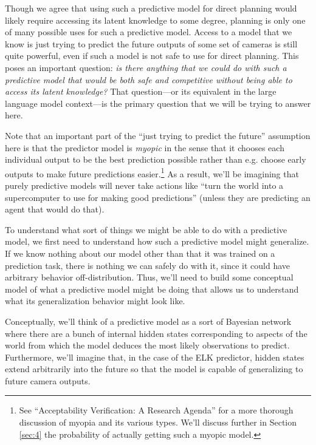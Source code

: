\documentclass[
  onecolumn,
  nonatbib,
]{miri-tech-article}
\begin{document}
Though we agree that using such a predictive model for direct planning would likely require accessing its latent knowledge to some degree, planning is only one of many possible uses for such a predictive model. Access to a model that we know is just trying to predict the future outputs of some set of cameras is still quite powerful, even if such a model is not safe to use for direct planning. This poses an important question: \textit{is there anything that we could do with such a predictive model that would be both safe and competitive without being able to access its latent knowledge?} That question---or its equivalent in the large language model context---is the primary question that we will be trying to answer here.

Note that an important part of the ``just trying to predict the future'' assumption here is that the predictor model is \textit{myopic} in the sense that it chooses each individual output to be the best prediction possible rather than e.g. choose early outputs to make future predictions easier.\footnote{See ``Acceptability Verification: A Research Agenda''\cite{acceptability_verification} for a more thorough discussion of myopia and its various types. We'll discuss further in Section \ref{sec:4} the probability of actually getting such a myopic model.} As a result, we'll be imagining that purely predictive models will never take actions like ``turn the world into a supercomputer to use for making good predictions'' (unless they are predicting an agent that would do that).

To understand what sort of things we might be able to do with a predictive model, we first need to understand how such a predictive model might generalize. If we know nothing about our model other than that it was trained on a prediction task, there is nothing we can safely do with it, since it could have arbitrary behavior off-distribution. Thus, we'll need to build some conceptual model of what a predictive model might be doing that allows us to understand what its generalization behavior might look like.

Conceptually, we'll think of a predictive model as a sort of Bayesian network where there are a bunch of internal hidden states corresponding to aspects of the world from which the model deduces the most likely observations to predict. Furthermore, we'll imagine that, in the case of the ELK predictor, hidden states extend arbitrarily into the future so that the model is capable of generalizing to future camera outputs.
\end{document}
